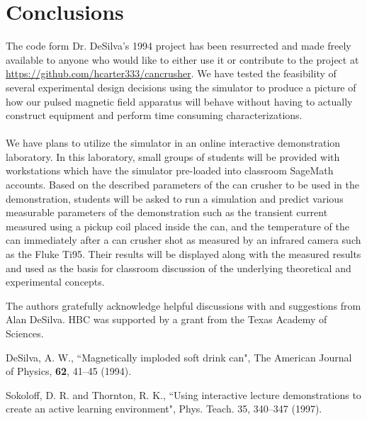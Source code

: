 \documentclass[prb,preprint]{revtex4-1}
\begin{document}
\section{Conclusions}
The code form Dr. DeSilva's 1994 project has been resurrected and made freely available to anyone who would like to either use it or contribute to the project at \url{https://github.com/hcarter333/cancrusher}.  We have tested the feasibility of several experimental design decisions using the simulator to produce a picture of how our pulsed magnetic field apparatus will behave without having to actually construct equipment and perform time consuming characterizations.
\\
\\
We have plans to utilize the simulator in an online interactive demonstration laboratory\cite{ILD}.  In this laboratory, small groups of students will be provided with workstations which have the simulator pre-loaded into classroom SageMath accounts.  Based on the described parameters of the can crusher to be used in the demonstration, students will be asked to run a simulation and predict various measurable parameters of the demonstration such as the transient current measured using a pickup coil placed inside the can, and the temperature of the can immediately after a can crusher shot as measured by an infrared camera such as the Fluke Ti95.  Their results will be displayed along with the measured results and used as the basis for classroom discussion of the underlying theoretical and experimental concepts.

\begin{acknowledgments}
The authors gratefully acknowledge helpful discussions with and suggestions from Alan DeSilva.  HBC was supported by a grant from the Texas Academy of Sciences.\end{acknowledgments}

\begin{thebibliography}{99}

 DeSilva, A. W., ``Magnetically imploded soft drink can", The American Journal of Physics, \textbf{62}, 41--45 (1994).  

 Sokoloff, D. R. and Thornton, R. K., ``Using interactive lecture demonstrations to create an active learning environment", Phys. Teach. 35, 340--347 (1997).  



\end{thebibliography}
\end{document}
